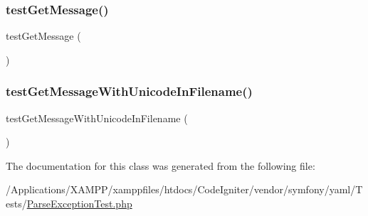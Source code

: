 \subsubsection{\texorpdfstring{test\+Get\+Message()}{testGetMessage()}}
{\footnotesize\ttfamily test\+Get\+Message (\begin{DoxyParamCaption}{ }\end{DoxyParamCaption})}

\mbox{\label{class_symfony_1_1_component_1_1_yaml_1_1_tests_1_1_parse_exception_test_a45a550db228607903bb8017e1d88eb91}} 
\subsubsection{\texorpdfstring{test\+Get\+Message\+With\+Unicode\+In\+Filename()}{testGetMessageWithUnicodeInFilename()}}
{\footnotesize\ttfamily test\+Get\+Message\+With\+Unicode\+In\+Filename (\begin{DoxyParamCaption}{ }\end{DoxyParamCaption})}



The documentation for this class was generated from the following file\+:\begin{DoxyCompactItemize}
\item 
/\+Applications/\+X\+A\+M\+P\+P/xamppfiles/htdocs/\+Code\+Igniter/vendor/symfony/yaml/\+Tests/\mbox{\hyperlink{_parse_exception_test_8php}{Parse\+Exception\+Test.\+php}}\end{DoxyCompactItemize}

